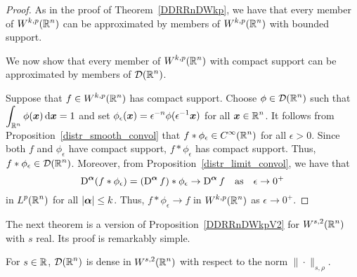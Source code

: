 \begin{proof}
As in the proof of Theorem~\ref{DDRRnDWkp}, we have that every member of
$\displaystyle W^{k,p}(\mathbb{R}^n)$ can be approximated by members of
$\displaystyle W^{k,p}(\mathbb{R}^n)$ with bounded support.

We now show that every member of $\displaystyle W^{k,p}(\mathbb{R}^n)$ with
compact support can be approximated by members of $\displaystyle \mathcal{D}(\mathbb{R}^n)$.

Suppose that $\displaystyle f \in W^{k,p}(\mathbb{R}^n)$ has compact
support.  Choose $\displaystyle \phi \in \mathcal{D}(\mathbb{R}^n)$ such that\\
$\displaystyle \int_{\mathbb{R}^n} \phi({\bm{x}}) \,\mathrm{d}{{\bm{x}}} = 1$
and set
$\displaystyle \phi_\epsilon({\bm{x}}) = \epsilon^{-n}\phi(\epsilon^{-1} {\bm{x}})$
for all $\displaystyle {\bm{x}} \in \mathbb{R}^n$.
It follows from Proposition~\ref{distr_smooth_convol} that
$\displaystyle f \ast \phi_{\epsilon} \in C^\infty(\mathbb{R}^n)$ for all $\epsilon>0$.
Since both $f$ and $\phi_\epsilon$ have compact support, 
$f \ast \phi_{\epsilon}$ has compact support.  Thus,
$\displaystyle f \ast \phi_{\epsilon} \in \mathcal{D}(\mathbb{R}^n)$.  Moreover, from 
Proposition~\ref{distr_limit_convol}, we have that
\[
  \operatorname{D}^{{\bm{\alpha}}} (f \ast \phi_\epsilon)
  = (\operatorname{D}^{{\bm{\alpha}}} f) \ast \phi_\epsilon \to \operatorname{D}^{{\bm{\alpha}}} f
\quad \text{as} \quad \epsilon \to 0^+
\]
in $\displaystyle L^p(\mathbb{R}^n)$ for all $|{\bm{\alpha}}| \leq k$.  Thus,
$f \ast \phi_{\epsilon} \to f$ in $\displaystyle W^{k,p}(\mathbb{R}^n)$ as
$\epsilon \to 0^+$.
\end{proof}

The next theorem is a version of Proposition~\ref{DDRRnDWkpV2} for
$\displaystyle W^{s,2}(\mathbb{R}^n)$ with $s$ real.  Its proof is remarkably simple.

\begin{theorem} \label{DDRRnDWs2}
For $s\in \mathbb{R}$, $\displaystyle \mathcal{D}(\mathbb{R}^n)$ is dense in
$\displaystyle W^{s,2}(\mathbb{R}^n)$ with
respect to the norm $\|\cdot\|_{s,\rho}$.
\end{theorem}

